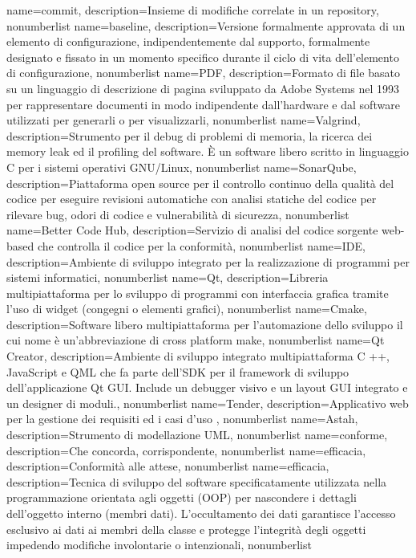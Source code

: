 {
	name={commit},
	description={Insieme di modifiche correlate in un repository},
	nonumberlist
}
{
	name={baseline},
	description={Versione formalmente approvata di un elemento di configurazione, indipendentemente dal supporto, formalmente designato e fissato in un momento specifico durante il ciclo di vita dell'elemento di configurazione},
	nonumberlist
}
{
	name={PDF},
	description={Formato di file basato su un linguaggio di descrizione di pagina sviluppato da Adobe Systems nel 1993 per rappresentare documenti in modo indipendente dall'hardware e dal software utilizzati per generarli o per visualizzarli},
	nonumberlist
}
{
	name={Valgrind},
	description={Strumento per il debug di problemi di memoria, la ricerca dei memory leak ed il profiling del software. È un software libero scritto in linguaggio C per i sistemi operativi GNU/Linux},
	nonumberlist
}
{
	name={SonarQube},
	description={Piattaforma open source per il controllo continuo della qualità del codice per eseguire revisioni automatiche con analisi statiche del codice per rilevare bug, odori di codice e vulnerabilità di sicurezza},
	nonumberlist
}
{
	name={Better Code Hub},
	description={Servizio di analisi del codice sorgente web-based che controlla il codice per la conformità},
	nonumberlist
}
{
	name={IDE},
	description={Ambiente di sviluppo integrato per la realizzazione di programmi per sistemi informatici},
	nonumberlist
}
{
	name={Qt},
	description={Libreria multipiattaforma per lo sviluppo di programmi con interfaccia grafica tramite l'uso di widget (congegni o elementi grafici)},
	nonumberlist
}
{
	name={Cmake},
	description={Software libero multipiattaforma per l'automazione dello sviluppo il cui nome è un'abbreviazione di cross platform make},
	nonumberlist
}
{
	name={Qt Creator},
	description={Ambiente di sviluppo integrato multipiattaforma C ++, JavaScript e QML che fa parte dell'SDK per il framework di sviluppo dell'applicazione Qt GUI. Include un debugger visivo e un layout GUI integrato e un designer di moduli.},
	nonumberlist
}
{
	name={Tender},
	description={Applicativo web per la gestione dei requisiti ed i casi d'uso },
	nonumberlist
}
{
	name={Astah},
	description={Strumento di modellazione UML},
	nonumberlist
}
{
	name={conforme},
	description={Che concorda, corrispondente},
	nonumberlist
}
{
	name={efficacia},
	description={Conformità alle attese},
	nonumberlist
}
{
	name={efficacia},
	description={Tecnica di sviluppo del software specificatamente utilizzata nella programmazione orientata agli oggetti (OOP) per nascondere i dettagli dell'oggetto interno (membri dati). L'occultamento dei dati garantisce l'accesso esclusivo ai dati ai membri della classe e protegge l'integrità degli oggetti impedendo modifiche involontarie o intenzionali},
	nonumberlist
}

